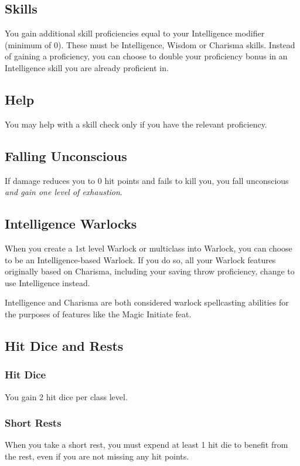 \documentclass[letterpaper,twocolumn,openany,nodeprecatedcode]{dndbook}
\begin{document}
\subsection{Skills}
You gain additional skill proficiencies equal to your Intelligence modifier (minimum of 0). These must be Intelligence, Wisdom or Charisma skills. Instead of gaining a proficiency, you can choose to double your proficiency bonus in an Intelligence skill you are already proficient in.

\subsection{Help}
You may help with a skill check only if you have the relevant proficiency.

\subsection{Falling Unconscious}
If damage reduces you to 0 hit points and fails to kill you, you fall unconscious \textit{and gain one level of exhaustion}.

\subsection{Intelligence Warlocks}
When you create a 1st level Warlock or multiclass into Warlock, you can choose to be an Intelligence-based Warlock. If you do so, all your Warlock features originally based on Charisma, including your saving throw proficiency, change to use Intelligence instead.

Intelligence and Charisma are both considered warlock spellcasting abilities for the purposes of features like the Magic Initiate feat.

\subsection{Hit Dice and Rests}

\subsubsection{Hit Dice}
You gain 2 hit dice per class level. 

\subsubsection{Short Rests}
When you take a short rest, you must expend at least 1 hit die to benefit from the rest, even if you are not missing any hit points.
\end{document}
